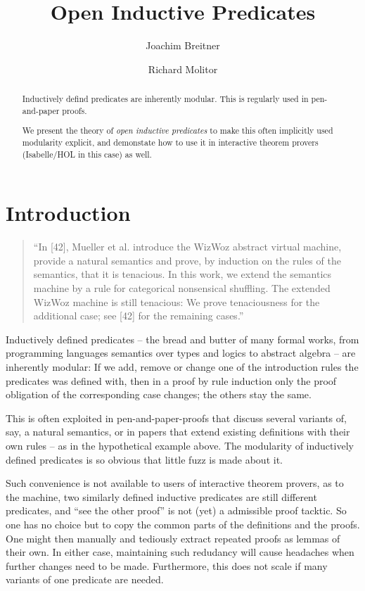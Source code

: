 \documentclass{llncs}
\title{Open Inductive Predicates}
\author{Joachim Breitner \and Richard Molitor}
\institute{Karlsruhe Institute of Technology}
\begin{document}
\maketitle

\begin{abstract}
Inductively defind predicates are inherently modular. This is regularly used in pen-and-paper proofs.

We present the theory of \emph{open inductive predicates} to make this often implicitly used modularity explicit, and demonstate how to use it in interactive theorem provers (Isabelle/HOL in this case) as well.
\end{abstract}

\section{Introduction}

\begin{quote}
“In [42], Mueller et al. introduce the WizWoz abstract virtual machine, provide a natural semantics and prove, by induction on the rules of the semantics, that it is tenacious. In this work, we extend the semantics machine by a rule for categorical nonsensical shuffling. The extended WizWoz machine is still tenacious: We prove tenaciousness for the additional case; see [42] for the remaining cases.”
\end{quote}

Inductively defined predicates -- the bread and butter of many formal works, from programming languages semantics over types and logics to abstract algebra -- are inherently modular: If we add, remove or change one of the introduction rules the predicates was defined with, then in a proof by rule induction only the proof obligation of the corresponding case changes; the others stay the same.

This is often exploited in pen-and-paper-proofs that discuss several variants of, say, a natural semantics, or in papers that extend existing definitions with their own rules -- as in the hypothetical example above. The modularity of inductively defined predicates is so obvious that little fuzz is made about it.

Such convenience is not available to users of interactive theorem provers, as to the machine, two similarly defined inductive predicates are still different predicates, and “see the other proof” is not (yet) a admissible proof tacktic. So one has no choice but to copy the common parts of the definitions and the proofs. One might then manually and tediously extract repeated proofs as lemmas of their own. In either case, maintaining such redudancy will cause headaches when further changes need to be made. Furthermore, this does not scale if many variants of one predicate are needed.
\end{document}
